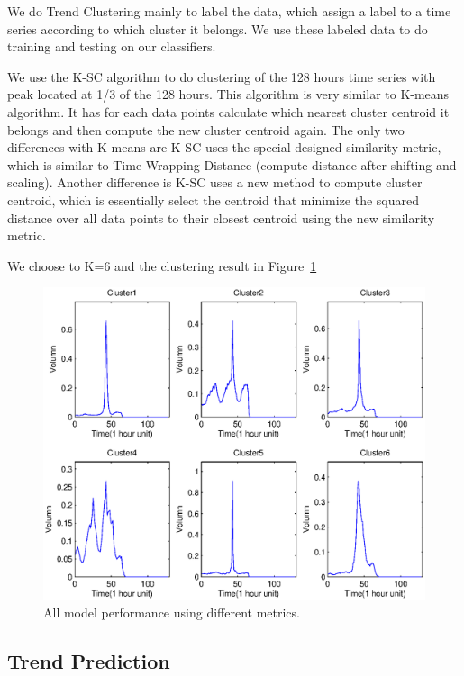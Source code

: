 \documentclass{article}
\begin{document}
We do Trend Clustering mainly to label the data, which assign a label to a time series according to which cluster it belongs. We use these labeled data to do training and testing on our classifiers. 

We use the K-SC algorithm \cite{Yang11} to do clustering of the 128 hours time series with peak located at 1/3 of the 128 hours. This algorithm is very similar to K-means algorithm. It has for each data points calculate which nearest cluster centroid it belongs and then compute the new cluster centroid again. The only two differences with K-means are K-SC uses the special designed similarity metric, which is similar to Time Wrapping Distance (compute distance after shifting and scaling). Another difference is K-SC uses a new method to compute cluster centroid, which is essentially select the centroid that minimize the squared distance over all data points to their closest centroid using the new similarity metric.     

We choose to K=6 and the clustering result in Figure~\ref{six-cluster}

\begin{figure}[ht]
\vskip 0.2in
\begin{center}
\centerline{\includegraphics[width=\columnwidth]{sixClusters}}
\caption{All model performance using different metrics.}
\label{six-cluster}
\end{center}
\vskip -0.2in
\end{figure} 

\subsection{Trend Prediction}
\end{document}
